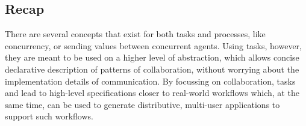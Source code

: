 


\subsection{Recap}

There are several concepts that exist for both tasks and processes, like concurrency, or sending values between concurrent agents.
Using tasks, however, they are meant to be used on a higher level of abstraction, which allows concise declarative description of patterns of collaboration, without worrying about the implementation details of communication.
By focussing on collaboration, tasks and \TOPHAT lead to high-level specifications closer to real-world workflows which, at the same time, can be used to generate distributive, multi-user applications to support such workflows.
